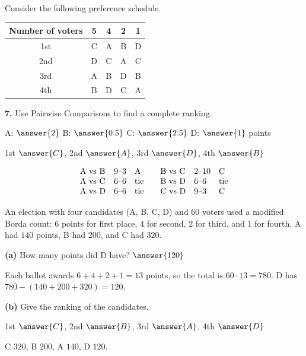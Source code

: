 \documentclass[12pt]{ximera}
\begin{document}
\begin{problem}
Consider the following preference schedule.
\begin{center}
\begin{tabular}{c|cccc}
Number of voters & 5 & 4 & 2 & 1\\\hline
1st & C & A & B & D\\
2nd & D & C & A & C\\
3rd & A & B & D & B\\
4th & B & D & C & A
\end{tabular}
\end{center}

\begin{prompt}
\textbf{7.} Use Pairwise Comparisons to find a complete ranking.

A: $\answer{2}$ \quad B: $\answer{0.5}$ \quad C: $\answer{2.5}$ \quad D: $\answer{1}$
points

\smallskip
1st $\answer{C}$, 2nd $\answer{A}$, 3rd $\answer{D}$, 4th $\answer{B}$

\begin{feedback}
\[
\begin{array}{lll@{\qquad}lll}
\text{A vs B} & 9\text{--}3 & \text{A} & \text{B vs C} & 2\text{--}10 & \text{C}\\
\text{A vs C} & 6\text{--}6 & \text{tie} & \text{B vs D} & 6\text{--}6 & \text{tie}\\
\text{A vs D} & 6\text{--}6 & \text{tie} & \text{C vs D} & 9\text{--}3 & \text{C}
\end{array}
\]
\end{feedback}
\end{prompt}

\end{problem}

\begin{problem}
An election with four candidates (A, B, C, D) and $60$ voters used a modified Borda
count: $6$ points for first place, $4$ for second, $2$ for third, and $1$ for fourth. A
had $140$ points, B had $200$, and C had $320$.

\begin{prompt}
\textbf{(a)} How many points did D have? $\answer{120}$

\begin{feedback}
Each ballot awards $6+4+2+1=13$ points, so the total is $60\cdot13=780$. D has
$780-(140+200+320)=120$.
\end{feedback}
\end{prompt}

\begin{prompt}
\textbf{(b)} Give the ranking of the candidates.

1st $\answer{C}$, 2nd $\answer{B}$, 3rd $\answer{A}$, 4th $\answer{D}$

\begin{feedback}
C $320$, B $200$, A $140$, D $120$.
\end{feedback}
\end{prompt}
\end{problem}
\end{document}
